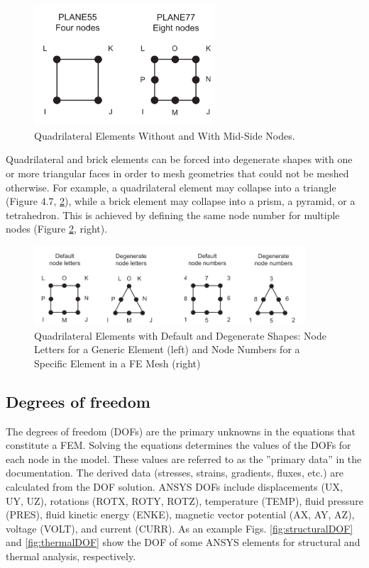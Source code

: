 \documentclass[letterpaper,pdftex]{article}
\begin{document}
\begin{figure}[h]
   \centering
   \includegraphics[width=0.6\textwidth]{nodesinelement}
   \caption{Quadrilateral Elements Without and With Mid-Side Nodes.}
   \label{fig:nodes}
\end{figure}

Quadrilateral and brick elements can be forced into degenerate shapes with one or more triangular faces in order to mesh geometries that could not be meshed otherwise. For example, a quadrilateral element may collapse into a triangle (Figure 4.7, \ref{fig:nodes_elements}), while a brick element may collapse into a prism, a pyramid, or a tetrahedron. This is achieved by defining the same node number for multiple nodes (Figure \ref{fig:nodes_elements}, right).

\begin{figure}[h]
   \centering
   \includegraphics[width=0.9\textwidth]{shapesandnodes}
   \caption{Quadrilateral Elements with Default and Degenerate Shapes: Node Letters for a Generic Element (left) and Node Numbers for a Specific Element in a FE Mesh (right)}
   \label{fig:nodes_elements}
\end{figure}

\subsection{Degrees of freedom}

The degrees of freedom (DOFs) are the primary unknowns in the equations that constitute a FEM. Solving the equations determines the values of the DOFs for each node in the model. These values are referred to as the ''primary data'' in the documentation. The derived data (stresses, strains, gradients, fluxes, etc.) are calculated from the DOF solution. ANSYS DOFs include displacements (UX, UY, UZ), rotations (ROTX, ROTY, ROTZ), temperature (TEMP), fluid pressure (PRES), fluid kinetic energy (ENKE), magnetic vector potential (AX, AY, AZ), voltage (VOLT), and current (CURR). As an example Figs. \ref{fig:structuralDOF} and \ref{fig:thermalDOF} show the DOF of some ANSYS elements for structural and thermal analysis, respectively.
\end{document}
